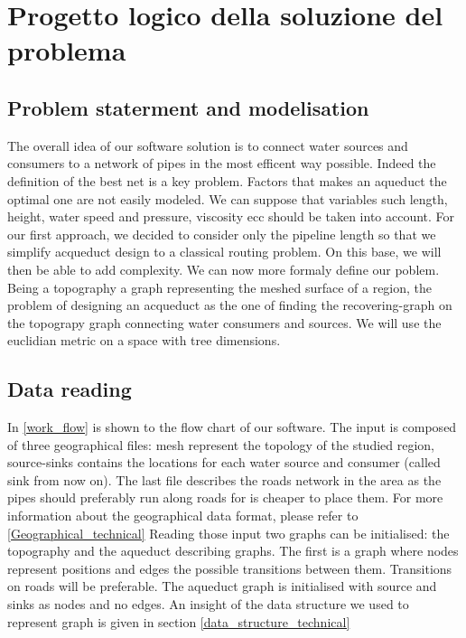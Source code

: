 \chapter{Progetto logico della soluzione del problema}
\label{capitolo4}
\thispagestyle{empty}


\section{Problem staterment and modelisation}
The overall idea of our software solution is to connect water sources and consumers to a network of 
pipes in the most efficent way possible. Indeed the definition of the best net is a key problem. 
Factors that makes an aqueduct the optimal one are not easily modeled. We can suppose that variables 
such length, height, water speed and pressure, viscosity ecc should be taken into account.
\hfill For our first approach, we decided to consider only the pipeline length so that we simplify 
acqueduct design to a classical routing problem. On this base, we will then be able to add complexity.
\hfill We can now more formaly define our poblem. Being a topography a graph representing the meshed 
surface of a region, the problem of designing an acqueduct as the one of finding the recovering-graph 
on the topograpy graph connecting water consumers and sources. We will use the euclidian metric on a 
space with tree dimensions.



\section{Data reading}
In \ref {work_flow} is shown to the flow chart of our software. 
The input is composed of three geographical files: mesh represent the topology of the studied region, source-sinks contains the locations for each water source and consumer (called sink from now on). The last file describes the roads network in the area as the pipes should preferably run along roads for is cheaper to place them. For more information about the geographical data format, please refer to \ref{Geographical_technical}
Reading those input two graphs can be initialised: the topography and the aqueduct describing graphs. The first is a graph where nodes represent positions and edges the possible transitions between them. Transitions on roads will be preferable. The aqueduct graph is initialised with source and sinks as nodes and no edges. An insight of the data structure we used to represent graph is given in section \ref {data_structure_technical}







